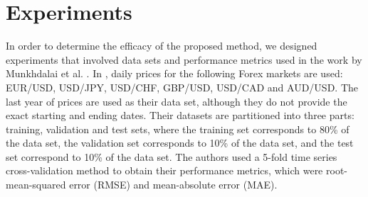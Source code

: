 ﻿\documentclass{ieeeaccess}
\begin{document}







\section{Experiments}
\label{section:experiments}

In order to determine the efficacy of the proposed method, we designed
experiments that involved data sets and performance metrics used in
the work by Munkhdalai et al. \cite{Munkhdalai2019}. In
\cite{Munkhdalai2019}, daily prices for the following Forex markets
are used: EUR/USD, USD/JPY, USD/CHF, GBP/USD, USD/CAD and AUD/USD. The last
year of prices are used as their data set, although they do not
provide the exact starting and ending dates. Their datasets are
partitioned into three parts: training, validation and test sets,
where the training set corresponds to 80\% of the data set, the
validation set corresponds to 10\% of the data set, and the test set
correspond to 10\% of the data set. The authors used a 5-fold time
series cross-validation method to obtain their performance metrics,
which were root-mean-squared error (RMSE) and mean-absolute error (MAE).
\end{document}
